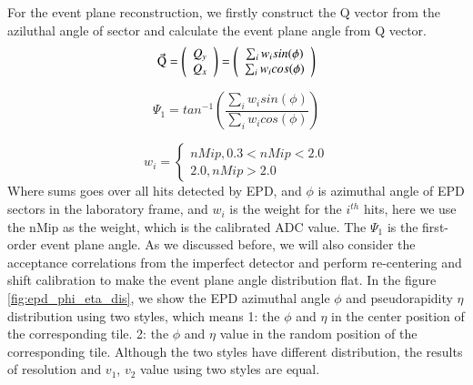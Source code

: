 For the event plane reconstruction, we firstly construct the Q vector from the aziluthal angle of sector and calculate the event plane angle from Q vector.
\begin{equation}
	\vec{\rm Q}=
	\left( \begin{array}{ccc}
		Q_{y} \\
		Q_{x}
	\end{array} \right)
	=
	\left( \begin{array}{ccc}
		\sum_{i}w_{i}sin(\phi) \\
		\sum_{i}w_{i}cos(\phi)
	\end{array} \right)
	\label{equ:Qvector_EPD}
\end{equation}

\begin{equation}
	\Psi_{1} = tan^{-1} \left( \frac{\sum_{i}w_{i}sin(\phi)}{\sum_{i}w_{i}cos(\phi)} \right)
	\label{equ:psi1_EPD}
\end{equation}

\begin{equation}
	w_{i} = 
	\begin{cases}
		nMip, 0.3<nMip<2.0 \\
		2.0, nMip > 2.0
	\end{cases}
	\label{equ:weight_EPD}
\end{equation}
Where sums goes over all hits detected by EPD, and $\phi$ is azimuthal angle of EPD sectors in the laboratory frame, and $w_{i}$ is the weight for the $i^{th}$ hits, here we use the nMip as the weight, which is the calibrated ADC value. The $\Psi_{1}$ is the first-order event plane angle. As we discussed before, we will also consider the acceptance correlations from the imperfect detector and  perform re-centering and shift calibration to make the event plane angle distribution flat. In the figure \ref{fig:epd_phi_eta_dis}, we show the EPD azimuthal angle $\phi$ and pseudorapidity $\eta$ distribution using two styles, which means 1: the $\phi$ and $\eta$ in the center position of the corresponding tile. 2: the $\phi$ and $\eta$ value in the random position of the corresponding tile. Although the two styles have different distribution, the results of resolution and $v_{1}$, $v_{2}$ value using two styles are equal.


